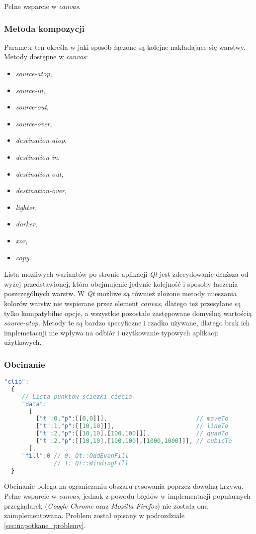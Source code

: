 Pełne wsparcie w \emph{canvas}. 

\subsubsection{Metoda kompozycji}
Parametr ten określa w jaki sposób łączone są kolejne nakładające się warstwy.\cite{compositionmode} Metody dostępne w \emph{canvas}:
\begin{itemize}
\item \emph{source-atop},
\item \emph{source-in},
\item \emph{source-out},
\item \emph{source-over},
\item \emph{destination-atop},
\item \emph{destination-in},
\item \emph{destination-out},
\item \emph{destination-over},
\item \emph{lighter},
\item \emph{darker},
\item \emph{xor},
\item \emph{copy}.
\end{itemize}

Lista mozliwych wariantów po stronie aplikacji \emph{Qt} jest zdecydowanie dłuższa od wyżej przedstawionej, która obejmujenie jedynie kolejność i sposoby łaczenia poszczególnych warstw. W \emph{Qt} możliwe są również złożone metody mieszania kolorów warstw nie wspierane przez element \emph{canvas}, dlatego też przesyłane są tylko kompatybilne opcje, a wszystkie pozostałe zastępowane domyślną wartością \emph{source-atop}. Metody te są bardzo specyficzne i rzadko używane, dlatego brak ich implemetacnji nie wpływa na odbiór i użytkowanie typowych aplikacji użytkowych.

\subsubsection{Obcinanie}
\begin{lstlisting}[language=JavaScript,numbers=none]
"clip":
  {
     // Lista punktow sciezki ciecia
     "data":			
       [
         ["t":0,"p":[[0,0]]],                         // moveTo
         ["t":1,"p":[[10,10]]],                       // lineTo
         ["t":2,"p":[[10,10],[100,100]]],             // quadTo
         ["t":2,"p":[[10,10],[100,100],[1000,1000]]], // cubicTo
       ],
     "fill":0 // 0: Qt::OddEvenFill
              // 1: Qt::WindingFill
  }
\end{lstlisting}
Obcinanie polega na ograniczaniu obszaru rysowania poprzez dowolną krzywą. 
Pełne wsparcie w \emph{canvas}, jednak z powodu błędów w implementacji popularnych przeglądarek (\emph{Google Chrome} oraz \emph{Mozilla Firefox}) nie została ona zaimplementowana. Problem został opisany w podrozdziale \ref{sec:napotkane_problemy}.